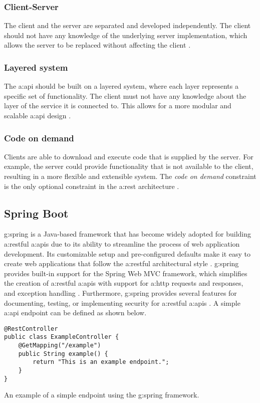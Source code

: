 \subsubsection{Client-Server}
The client and the server are separated and developed independently. The client should not have any knowledge of the underlying server implementation, which allows the server to be replaced without affecting the client \cite{RESTGuidelines}.
\subsubsection{Layered system}
The \gls{a:api} should be built on a layered system, where each layer represents a specific set of functionality. The client must not have any knowledge about the layer of the service it is connected to. This allows for a more modular and scalable \gls{a:api} design \cite{RESTGuidelines}.
\subsubsection{Code on demand}
Clients are able to download and execute code that is supplied by the server. For example, the server could provide functionality that is not available to the client, resulting in a more flexible and extensible system. The \textit{code on demand} constraint is the only optional constraint in the \gls{a:rest} architecture \cite{RESTGuidelines}.

\subsection{Spring Boot}\label{sec:tf-spring}

\Gls{g:spring} is a Java-based framework that has become widely adopted for building \gls{a:rest}ful \glspl{a:api} due to its ability to streamline the process of web application development. Its customizable setup and pre-configured defaults make it easy to create web applications that follow the \gls{a:rest}ful architectural style \cite{SpringBoot}. \Gls{g:spring} provides built-in support for the Spring Web MVC framework, which simplifies the creation of \gls{a:rest}ful \glspl{a:api} with support for \gls{a:http} requests and responses, and exception handling \cite{SpringMvc}. Furthermore, \gls{g:spring} provides several features for documenting, testing, or implementing security for \gls{a:rest}ful \glspl{a:api} \cite{SpringFramework}. A simple \gls{a:api} endpoint can be defined as shown below.

\begin{listing}[H]
\begin{verbatim}
@RestController
public class ExampleController {
    @GetMapping("/example")
    public String example() {
        return "This is an example endpoint.";
    }
}
\end{verbatim}
\vspace{-.6cm}
\caption{An example of a simple endpoint using the \gls{g:spring} framework.}
\label{lst:spring-example}
\end{listing}
\vspace{-.3cm}

